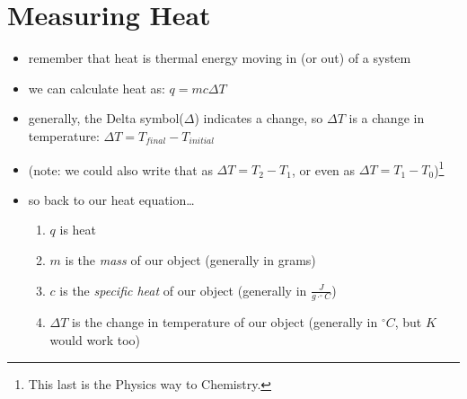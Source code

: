 \documentclass[11pt, oneside]{article}   	%
\begin{document}
\section{Measuring Heat}
\begin{itemize}
\item remember that heat is thermal energy moving in (or out) of a system
\item we can calculate heat as: $q = m c \Delta T$
\item generally, the Delta symbol($\Delta$) indicates a change, so $\Delta T$ is a change in temperature: $\Delta T = T_{final} - T_{initial}$
\item (note: we could also write that as $\Delta T = T_2 - T_1$, or even as $\Delta T = T_1 - T_0$)\footnote{This last is the Physics way to Chemistry.}
\item so back to our heat equation\ldots
\begin{enumerate}
\item $q$ is heat
\item $m$ is the \emph{mass} of our object (generally in grams)
\item $c$ is the \emph{specific heat} of our object (generally in $\frac{J}{g \cdot ^{\circ}C}$)
\item $\Delta T$ is the change in temperature of our object (generally in $^{\circ}C$, but $K$ would work too)
\end{enumerate}
\end{itemize}
\end{document}
